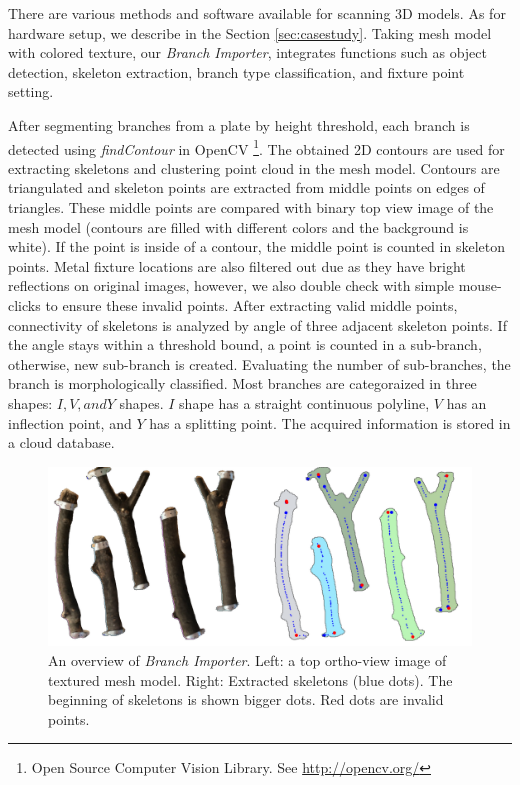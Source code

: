 There are various methods and software available for scanning 3D models.
As for hardware setup, we describe in the Section \ref{sec:casestudy}.
Taking mesh model with colored texture, our \textit{Branch Importer}, integrates functions such as object detection, skeleton extraction, branch type classification, and fixture point setting.


After segmenting branches from a plate by height threshold, each branch is detected using \textit{findContour} in OpenCV \footnote{Open Source Computer Vision Library. See \url{http://opencv.org/} }.
The obtained 2D contours are used for extracting skeletons and clustering point cloud in the mesh model.
Contours are triangulated and skeleton points are extracted from middle points on edges of triangles.
These middle points are compared with binary top view image of the mesh model (contours are filled with different colors and the background is white).
If the point is inside of a contour, the middle point is counted in skeleton points.
Metal fixture locations are also filtered out due as they have bright reflections on original images, however, we also double check with simple mouse-clicks to ensure these invalid points.
After extracting valid middle points, connectivity of skeletons is analyzed by angle of three adjacent skeleton points.
If the angle stays within a threshold bound, a point is counted in a sub-branch, otherwise, new sub-branch is created.
Evaluating the number of sub-branches, the branch is morphologically classified.
Most branches are categoraized in three shapes:  $I, V, and Y$ shapes.
$I$ shape has a straight continuous polyline, $V$ has an inflection point, and $Y$ has a splitting point.
The acquired information is stored in a cloud database.

\begin{figure}[ht]
  \includegraphics[width = 0.4\paperwidth]{images/importer/importer.png}
  \caption{An overview of \textit{Branch Importer}. Left: a top ortho-view image of textured mesh model. Right: Extracted skeletons (blue dots). The beginning of skeletons is shown bigger dots. Red dots are invalid points. }
  \label{fig:skeleton}
\end{figure}




